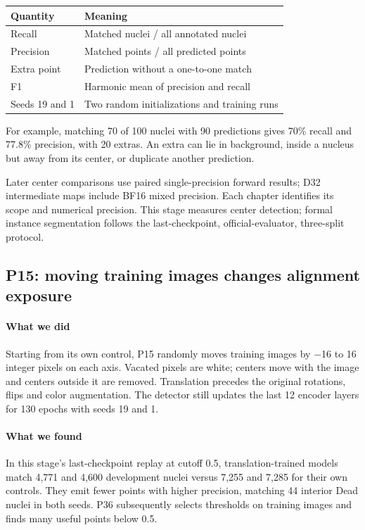 \documentclass[
  12pt,
]{article}
\newcounter{none} %
\begin{document}
{\def\LTcaptype{none}
\begin{longtable}[]{@{}
  >{\raggedright\arraybackslash}p{}
  >{\raggedright\arraybackslash}p{}@{}}
\toprule\noalign{}
Quantity & Meaning\\
\midrule\noalign{}
\endhead
\bottomrule\noalign{}
\endlastfoot
Recall & Matched nuclei / all annotated nuclei\\
Precision & Matched points / all predicted points\\
Extra point & Prediction without a one-to-one match\\
F1 & Harmonic mean of precision and recall\\
Seeds 19 and 1 & Two random initializations and training runs\\
\end{longtable}}
For example, matching 70 of 100 nuclei with 90 predictions gives 70\% recall and 77.8\% precision, with 20 extras. An extra can lie in background, inside a nucleus but away from its center, or duplicate another prediction.

Later center comparisons use paired single-precision forward results; D32 intermediate maps include BF16 mixed precision. Each chapter identifies its scope and numerical precision. This stage measures center detection; formal instance segmentation follows the last-checkpoint, official-evaluator, three-split protocol.

\subsection{P15: moving training images changes alignment exposure}\label{chapter5}
\paragraph{What we did}
Starting from its own control, P15 randomly moves training images by \ensuremath{-}16 to 16 integer pixels on each axis. Vacated pixels are white; centers move with the image and centers outside it are removed. Translation precedes the original rotations, flips and color augmentation. The detector still updates the last 12 encoder layers for 130 epochs with seeds 19 and 1.

\paragraph{What we found}
In this stage’s last-checkpoint replay at cutoff 0.5, translation-trained models match 4,771 and 4,600 development nuclei versus 7,255 and 7,285 for their own controls. They emit fewer points with higher precision, matching 44 interior Dead nuclei in both seeds. P36 subsequently selects thresholds on training images and finds many useful points below 0.5.
\end{document}
